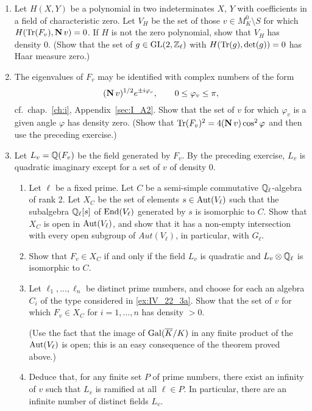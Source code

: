 \begin{enumerate}
\item Let $H(X, Y)$ be a polynomial in two indeterminates $X$, $Y$ with
	coefficients in a field of characteristic zero. Let $V_H$ be the set of
	those $v \in M_K^0 \setminus S$ for which $H(\operatorname{Tr}(F_v), \operatorname{\mathbf{N}} v) =
	0$. If $H$ is not the zero polynomial, show that $V_H$ has density 0.
	(Show that the set of $g \in \operatorname{GL}(2, \mathbb{Z}_\ell)$ with $H(\operatorname{Tr}(g), \det(g)) =
	0$ has Haar measure zero.)

\item The eigenvalues of $F_v$ may be identified with complex numbers of the
	form
	\[
		(\operatorname{\mathbf{N}} v)^{1/2} e^{\pm i \varphi_v},
		\qquad 0 \le \varphi_v \le \pi,
	\]
	cf.\ chap.~\ref{ch:i}, Appendix~\ref{sec:I_A2}. Show that the set of
	$v$ for which $\varphi_v$ is a given angle $\varphi$ has density zero.
	(Show that $\operatorname{Tr}(F_v)^2 = 4(\operatorname{\mathbf{N}} v)\cos^2 \varphi$ and then use the
	preceding exercise.)

\item Let $L_v = \mathbb{Q}(F_v)$ be the field generated by $F_v$. By the preceding
	\dpage
	exercise, $L_v$ is quadratic imaginary except for a set of $v$ of
	density 0.
	\begin{enumerate}
	\item\label{ex:IV_22_3a} Let $\ell$ be a fixed prime. Let $C$ be a semi-simple commutative
		$\mathbb{Q}_\ell$-algebra of rank 2. Let $X_C$ be the set of elements
		$s \in \operatorname{Aut}(V_\ell)$ such that the subalgebra $\mathbb{Q}_\ell[s]$ of
		$\operatorname{End}(V_\ell)$ generated by $s$ is isomorphic to $C$. Show that
		$X_C$ is open in $\operatorname{Aut}(V_\ell)$, and show that it has a
		non-empty intersection with every open subgroup of
		$Aut(V_\ell)$, in particular, with $G_\ell$.
	\item Show that $F_v \in X_C$ if and only if the field $L_v$ is
		quadratic and $L_v \otimes \mathbb{Q}_\ell$ is isomorphic to $C$.
	\item Let $\ell_1, \dots, \ell_n$ be distinct prime numbers, and choose
		for each an algebra $C_i$ of the type considered in
		\ref{ex:IV_22_3a}. Show that the set of $v$ for which $F_v \in
		X_C$ for $i = 1, \dots, n$ has density $> 0$.

		(Use the fact that the image of $\operatorname{Gal}(\overline{K}/K)$ in any
		finite product of the $\operatorname{Aut}(V_\ell)$ is open; this is an easy
		consequence of the theorem proved above.)
	\item Deduce that, for any finite set $P$ of prime numbers, there exist
		an infinity of $v$ such that $L_v$ is ramified at all $\ell \in
		P$. In particular, there are an infinite number of distinct
		fields $L_v$.
	\end{enumerate}
\end{enumerate}

